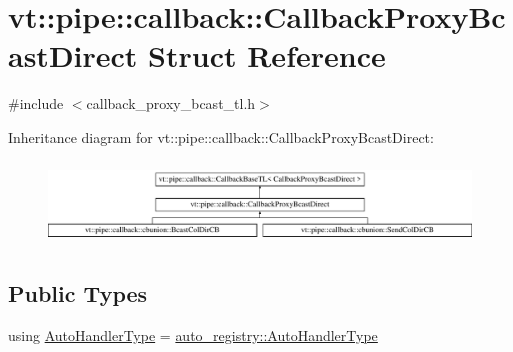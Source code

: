 \hypertarget{structvt_1_1pipe_1_1callback_1_1_callback_proxy_bcast_direct}{}\section{vt\+:\+:pipe\+:\+:callback\+:\+:Callback\+Proxy\+Bcast\+Direct Struct Reference}
\label{structvt_1_1pipe_1_1callback_1_1_callback_proxy_bcast_direct}


{\ttfamily \#include $<$callback\+\_\+proxy\+\_\+bcast\+\_\+tl.\+h$>$}

Inheritance diagram for vt\+:\+:pipe\+:\+:callback\+:\+:Callback\+Proxy\+Bcast\+Direct\+:\begin{figure}[H]
\begin{center}
\leavevmode
\includegraphics[height=2.204725cm]{structvt_1_1pipe_1_1callback_1_1_callback_proxy_bcast_direct}
\end{center}
\end{figure}
\subsection*{Public Types}
\begin{DoxyCompactItemize}
\item 
using \hyperlink{structvt_1_1pipe_1_1callback_1_1_callback_proxy_bcast_direct_a543cd86434430bd048952534f4fbc128}{Auto\+Handler\+Type} = \hyperlink{namespacevt_1_1auto__registry_ae295e18699146815bb7d7674594d95d7}{auto\+\_\+registry\+::\+Auto\+Handler\+Type}
\end{DoxyCompactItemize}

